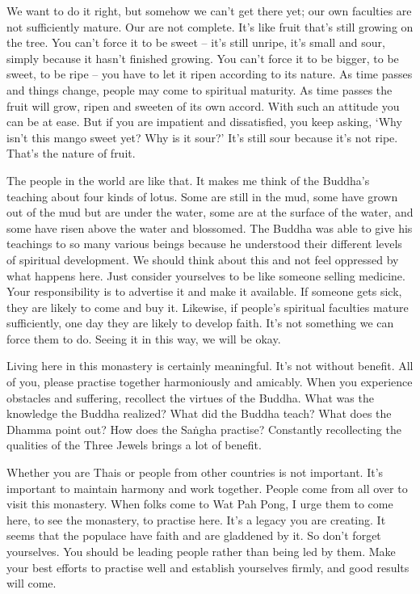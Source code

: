We want to do it right, but somehow we can't get there yet; our own faculties are not sufficiently mature. Our  are not complete. It's like fruit that's still growing on the tree. You can't force it to be sweet -- it's still unripe, it's small and sour, simply because it hasn't finished growing. You can't force it to be bigger, to be sweet, to be ripe -- you have to let it ripen according to its nature. As time passes and things change, people may come to spiritual maturity. As time passes the fruit will grow, ripen and sweeten of its own accord. With such an attitude you can be at ease. But if you are impatient and dissatisfied, you keep asking, `Why isn't this mango sweet yet? Why is it sour?' It's still sour because it's not ripe. That's the nature of fruit. 

The people in the world are like that. It makes me think of the Buddha's teaching about four kinds of lotus. Some are still in the mud, some have grown out of the mud but are under the water, some are at the surface of the water, and some have risen above the water and blossomed. The Buddha was able to give his teachings to so many various beings because he understood their different levels of spiritual development. We should think about this and not feel oppressed by what happens here. Just consider yourselves to be like someone selling medicine. Your responsibility is to advertise it and make it available. If someone gets sick, they are likely to come and buy it. Likewise, if people's spiritual faculties mature sufficiently, one day they are likely to develop faith. It's not something we can force them to do. Seeing it in this way, we will be okay. 

Living here in this monastery is certainly meaningful. It's not without benefit. All of you, please practise together harmoniously and amicably. When you experience obstacles and suffering, recollect the virtues of the Buddha. What was the knowledge the Buddha realized? What did the Buddha teach? What does the Dhamma point out? How does the Sa\.ngha practise? Constantly recollecting the qualities of the Three Jewels brings a lot of benefit. 

Whether you are Thais or people from other countries is not important. It's important to maintain harmony and work together. People come from all over to visit this monastery. When folks come to Wat Pah Pong, I urge them to come here, to see the monastery, to practise here. It's a legacy you are creating. It seems that the populace have faith and are gladdened by it. So don't forget yourselves. You should be leading people rather than being led by them. Make your best efforts to practise well and establish yourselves firmly, and good results will come. 


